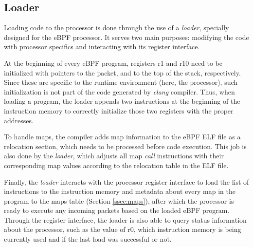 
\subsection{Loader}
\label{ssec:loader}
Loading code to the processor is done through the use of a \textit{loader}, specially designed for the eBPF processor. It serves two main purposes: modifying the code with processor specifics and interacting with its register interface.

At the beginning of every eBPF program, registers r1 and r10 need to be initialized with pointers to the packet, and to the top of the stack, respectively. Since these are specific to the runtime environment (here, the processor), such initialization is not part of the code generated by \textit{clang} compiler. Thus, when loading a program, the loader appends two instructions at the beginning of the instruction memory to correctly initialize those two registers with the proper addresses. 

To handle maps, the compiler adds map information to the eBPF ELF file as a relocation section, which needs to be processed before code execution. This job is also done by the \textit{loader}, which adjusts all map \textit{call} instructions with their corresponding map values according to the relocation table in the ELF file.

Finally, the \textit{loader} interacts with the processor register interface to load the list of instructions to the instruction memory and metadata about every map in the program to the maps table (Section \ref{ssec:maps}), after which the processor is ready to execute any incoming packets based on the loaded eBPF program. Through the register interface, the loader is also able to query status information about the processor, such as the value of r0, which instruction memory is being currently used and if the last load was successful or not.

